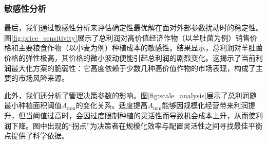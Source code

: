 
\subsubsection{敏感性分析}

最后，我们通过敏感性分析来评估确定性最优解在面对外部参数扰动时的稳定性。图\ref{fig:price_sensitivity}展示了总利润对高价值经济作物（以羊肚菌为例）销售价格和主要粮食作物（以小麦为例）种植成本的敏感性。结果显示，总利润对羊肚菌价格的弹性极高，其价格的微小波动便能引起总利润的剧烈变化。这揭示了当前利润最大化方案的脆弱性：它高度依赖于少数几种高价值作物的市场表现，构成了主要的市场风险来源。


此外，我们还分析了管理决策参数的影响。图\ref{fig:scale_analysis}展示了总利润随最小种植面积阈值$A_{\min}$的变化关系。适度提高$A_{\min}$能够因规模化经营带来利润提升，但当阈值过高时，会因过度限制种植的灵活性而导致机会成本上升，从而使利润下降。图中出现的“拐点”为决策者在规模化效率与配置灵活性之间寻找最佳平衡点提供了科学依据。







